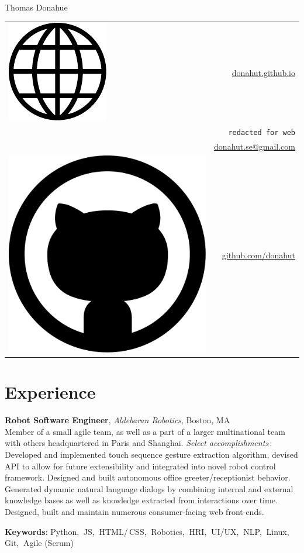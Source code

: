 \documentclass[10pt, letter]{article}
\newcommand*\globe{\includegraphics[height=1.6ex]{globe.pdf}}
\newcommand*\github{\includegraphics[height=2ex]{github.pdf}}
\newcommand{\years}[1]{\marginnote{\footnotesize #1}}
\newenvironment{desc*}{
  \begin{description}
    \setlength{\itemsep}{0.2pt}
    \setlength{\parskip}{-1pt}
    \setlength{\parsep}{0pt}
  }{
  \end{description}
}
\begin{document}
\begin{minipage}[t]{0.55\textwidth}
  {\Huge Thomas Donahue}
\end{minipage}
\begin{minipage}[t]{0.45\textwidth}
  \flushright 
  \begin{tabular}[h]{lr}
    \globe{}    & \href{http://donahut.github.io}{donahut.github.io}\\    
    \Phone{}    & \texttt{redacted for web}\\
    \Envelope{} & \href{mailto:donahut.se@gmail.com}{donahut.se@gmail.com}\\    
    \github{}   & \href{http://www.github.com/donahut}{github.com/donahut}
  \end{tabular}
\end{minipage}

\section*{Experience}
\years{Mar 2014 --} 
\textbf{\fontsize{10.5pt}{1em}\selectfont Robot Software Engineer},
\textsl{Aldebaran Robotics}, Boston, MA\\

\vspace{-.3cm} 
Member of a small agile team, as well as a part of a larger
multinational team with others headquartered in Paris and Shanghai.
\textsl{Select accomplishments}\,:\, Developed and implemented touch
sequence gesture extraction algorithm, devised API to allow for future
extensibility and integrated into novel robot control framework.
Designed and built autonomous office greeter/receptionist behavior.
Generated dynamic natural language dialogs by combining internal and
external knowledge bases as well as knowledge extracted from
interactions over time. Designed, built and maintain numerous
consumer-facing web front-ends.
\vspace{-.1cm}
\begin{desc*}
\item[\rm \textbf{Keywords}:] Python,$\:$ JS,$\:$ HTML/\,CSS,$\:$
  Robotics,$\:$ HRI,$\:$ UI/UX,$\:$ NLP,$\:$ Linux,$\:$ Git,$\:$ Agile (Scrum)\\
\end{desc*}
\end{document}
